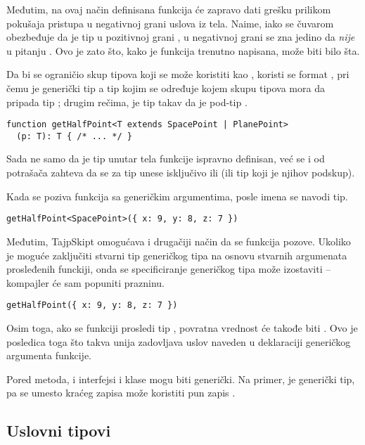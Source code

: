 Međutim, na ovaj način definisana funkcija će zapravo dati grešku prilikom pokušaja pristupa u negativnoj grani uslova iz tela.
Naime, iako se čuvarom obezbeđuje da je tip u pozitivnoj grani , u negativnoj grani se zna jedino da \emph{nije} u pitanju .
Ovo je zato što, kako je funkcija trenutno napisana,  može biti bilo šta.

Da bi se ograničio skup tipova koji se može koristiti kao , koristi se format , pri čemu je  generički tip a  tip kojim se određuje kojem skupu tipova mora da pripada tip ; drugim rečima,  je tip takav da je  pod-tip .

\begin{verbatim}
function getHalfPoint<T extends SpacePoint | PlanePoint>
  (p: T): T { /* ... */ }
\end{verbatim}

Sada ne samo da je tip unutar tela funkcije ispravno definisan, već se i od potrašača zahteva da se za tip unese isključivo  ili  (ili tip koji je njihov podskup).

Kada se poziva funkcija sa generičkim argumentima, posle imena se navodi tip.

\begin{verbatim}
getHalfPoint<SpacePoint>({ x: 9, y: 8, z: 7 })
\end{verbatim}

Međutim, TajpSkipt omogućava i drugačiji način da se funkcija pozove.
Ukoliko je moguće zaključiti stvarni tip generičkog tipa na osnovu stvarnih argumenata prosleđenih funckiji, onda se specificiranje generičkog tipa može izostaviti -- kompajler će sam popuniti prazninu.

\begin{verbatim}
getHalfPoint({ x: 9, y: 8, z: 7 })
\end{verbatim}

Osim toga, ako se funkciji prosledi tip , povratna vrednost će takođe biti .
Ovo je posledica toga što takva unija zadovljava  uslov naveden u deklaraciji generičkog argumenta funkcije.

Pored metoda, i interfejsi i klase mogu biti generički.
Na primer,  je generički tip, pa se umesto kraćeg zapisa  može koristiti pun zapis .

\subsection{Uslovni tipovi}

